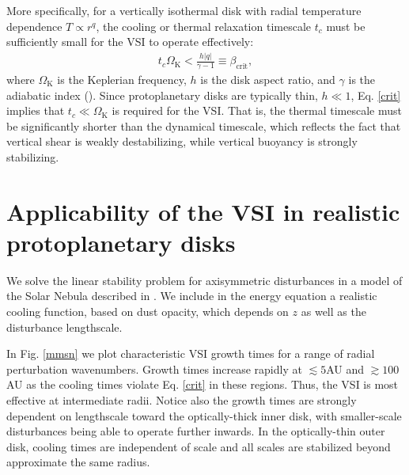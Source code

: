 \documentclass{iau}
\begin{document}
More specifically, for a vertically isothermal disk with radial
temperature dependence $T\propto r^{q}$, the cooling or thermal
relaxation timescale $t_c$ must be sufficiently small for the VSI to
operate effectively:
\begin{align}\label{crit}
  t_c\Omega_\mathrm{K} < \frac{h|q|}{\gamma - 1}\equiv
  \beta_\mathrm{crit},  
\end{align}
where $\Omega_\mathrm{K}$ is the Keplerian frequency, $h$  is the disk
aspect ratio, and $\gamma$ is the adiabatic index (\cite[Lin \& Youdin
2015]{lin15}). 
Since protoplanetary disks are typically thin, $h\ll 1$,
Eq. \ref{crit} implies that $t_c \ll \Omega_\mathrm{K}$ is required
for the VSI. That is, the thermal timescale must be significantly
shorter than the dynamical timescale, which reflects the fact that
vertical shear is weakly destabilizing, while vertical buoyancy is
strongly stabilizing. 




\section{Applicability of the VSI in realistic protoplanetary disks} 
We solve the linear stability problem for axisymmetric
disturbances in a model of the Solar Nebula described in \cite[Chiang
\& Youdin (2010)]{chiang10}. We include in the energy equation a
realistic cooling function, based on dust opacity, which depends on
$z$ as well as the disturbance lengthscale.  

In Fig. \ref{mmsn} we plot characteristic VSI growth times for a range
of radial perturbation wavenumbers. Growth times increase rapidly at $\lesssim5$AU
and $\gtrsim 100$AU as the cooling times violate Eq. \ref{crit} in
these regions. Thus, the VSI is most effective at intermediate
radii. Notice also the growth times are strongly dependent on
lengthscale toward the optically-thick inner disk, with smaller-scale
disturbances being able to operate further inwards. In the
optically-thin outer disk, cooling times are independent of scale and
all scales are stabilized beyond approximate the same radius.  
\end{document}
